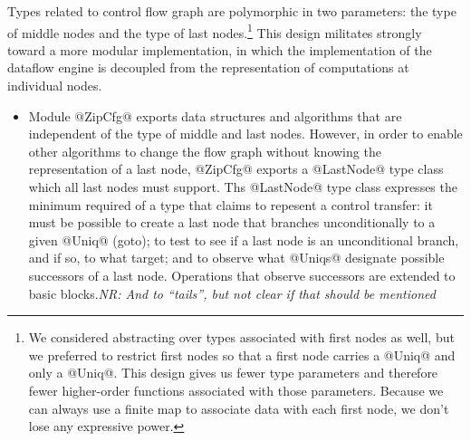 \documentclass[blockstyle,preprint,nocopyrightspace]{sigplanconf}
\newcommand{\authornote}[1]{{\em #1}}
\newcommand{\norman}[1]{\authornote{NR: #1}}
\let\remark\norman
\begin{document}
Types related to control flow graph are polymorphic in two parameters:
the type of middle nodes and the type of last nodes.\footnote
{We considered abstracting over types associated with first nodes as
  well, but we preferred to restrict first nodes so that a first node
  carries a @Uniq@ and only a @Uniq@.
  This design gives us fewer type parameters and
  therefore fewer higher-order functions associated with those
  parameters.
  Because we can always use a finite map to associate data with
  each first node, we don't lose any expressive power.}
This design militates strongly toward a more modular implementation,
in which the implementation of the dataflow engine is 
decoupled from the representation of computations at individual nodes.
\begin{itemize}
\item
Module @ZipCfg@ exports data structures and algorithms that are
independent of the type of middle and last nodes.
However, in order to enable other algorithms to change the flow graph
without knowing the representation of a last node, @ZipCfg@ exports a
@LastNode@ type class which all last nodes must support.
Ths @LastNode@ type class expresses the minimum required of a type
that claims to repesent a control transfer:
it must be possible to
create a last node that branches unconditionally to a given @Uniq@ (goto);
to test to see if a last node is an unconditional branch, and if so, to
what target;
and to observe what @Uniqs@ designate possible successors of a last
node.
Operations that observe successors are extended to basic
blocks.\remark{And to ``tails'', but not clear if that should be
  mentioned}


\end{itemize}
\end{document}

